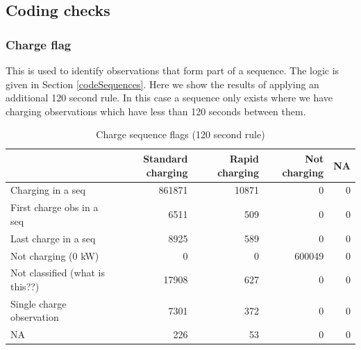 \documentclass[]{article}
\newenvironment{Shaded}{\begin{snugshade}}{\end{snugshade}}
\newcommand{\DataTypeTok}[1]{\textcolor[rgb]{0.13,0.29,0.53}{#1}}
\newcommand{\KeywordTok}[1]{\textcolor[rgb]{0.13,0.29,0.53}{\textbf{#1}}}
\newcommand{\NormalTok}[1]{#1}
\newcommand{\OperatorTok}[1]{\textcolor[rgb]{0.81,0.36,0.00}{\textbf{#1}}}
\newcommand{\StringTok}[1]{\textcolor[rgb]{0.31,0.60,0.02}{#1}}
\begin{document}
\hypertarget{coding-checks}{%
\subsection{Coding checks}\label{coding-checks}}

\hypertarget{chargeFlagTest}{%
\subsubsection{Charge flag}\label{chargeFlagTest}}

This is used to identify observations that form part of a sequence. The logic is given in Section \ref{codeSequences}. Here we show the results of applying an additional 120 second rule. In this case a sequence only exists where we have charging observations which have less than 120 seconds between them.

\begin{Shaded}
\end{Shaded}

\begin{table}[t]

\caption{\label{tab:checkChargeFlagMethods}Charge sequence flags (120 second rule)}
\centering
\begin{tabular}{l|r|r|r|r}
\hline
  & Standard charging & Rapid charging & Not charging & NA\\
\hline
Charging in a seq & 861871 & 10871 & 0 & 0\\
\hline
First charge obs in a seq & 6511 & 509 & 0 & 0\\
\hline
Last charge in a seq & 8925 & 589 & 0 & 0\\
\hline
Not charging (0 kW) & 0 & 0 & 600049 & 0\\
\hline
Not classified (what is this??) & 17908 & 627 & 0 & 0\\
\hline
Single charge observation & 7301 & 372 & 0 & 0\\
\hline
NA & 226 & 53 & 0 & 0\\
\hline
\end{tabular}
\end{table}

\begin{Shaded}
\end{Shaded}
\end{document}

